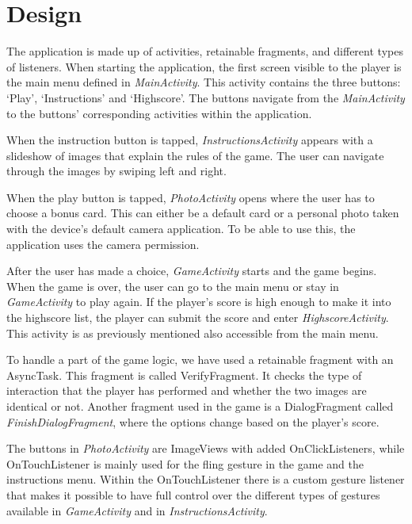 \section{Design}
The application is made up of activities, retainable fragments, and different types of listeners. When starting the application, the first screen visible to the player is the main menu defined in \emph{MainActivity}. This activity contains the three buttons: `Play', `Instructions' and `Highscore'. The buttons navigate from the \emph{MainActivity} to the buttons' corresponding activities within the application. 

When the instruction button is tapped, \emph{InstructionsActivity} appears with a slideshow of images that explain the rules of the game. The user can navigate through the images by swiping left and right. \newline

When the play button is tapped, \emph{PhotoActivity} opens where the user has to choose a bonus card. This can either be a default card or a personal photo taken with the device’s default camera application. To be able to use this, the application uses the camera permission. \newline

After the user has made a choice, \emph{GameActivity} starts and the game begins. When the game is over, the user can go to the main menu or stay in \emph{GameActivity} to play again. If the player's score is high enough to make it into the highscore list, the player can submit the score and enter \emph{HighscoreActivity}. This activity is as previously mentioned also accessible from the main menu. \newline

To handle a part of the game logic, we have used a retainable fragment with an AsyncTask. This fragment is called VerifyFragment. It checks the type of interaction that the player has performed and whether the two images are identical or not. Another fragment used in the game is a  DialogFragment called \emph{FinishDialogFragment}, where the options change based on the player’s score. \newline

The buttons in \emph{PhotoActivity} are ImageViews with added OnClickListeners, while OnTouchListener is mainly used for the fling gesture in the game and the instructions menu. Within the OnTouchListener there is a custom gesture listener that makes it possible to have full control over the different types of gestures available in \emph{GameActivity} and in \emph{InstructionsActivity}.

